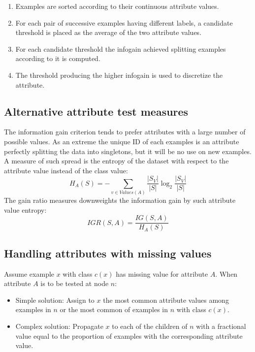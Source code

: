 	\begin{multicols}{2}
		\begin{enumerate}
			\item Examples are sorted according to their continuous attribute values.
			\item For each pair of successive examples having different labels, a candidate threshold is placed as the average of the two attribute values.
			\item For each candidate threshold the infogain achieved splitting examples according to it is computed.
			\item The threshold producing the higher infogain is used to discretize the attribute.
		\end{enumerate}
	\end{multicols}

	\subsection{Alternative attribute test measures}
	The information gain criterion tends to prefer attributes with a large number of possible values.
	As an extreme the unique ID of each examples is an attribute perfectly splitting the data into singletons, but it will be no use on new examples.
	A measure of such spread is the entropy of the dataset with respect to the attribute value instead of the class value:
	$$H_A(S) = -\sum\limits_{v\in Values(A)}\dfrac{|S_V|}{|S|}\log_2\dfrac{|S_V|}{|S|}$$
	The gain ratio measures downweights the information gain by such attribute value entropy:
	$$IGR(S,A) = \dfrac{IG(S,A)}{H_A(S)}$$

	\subsection{Handling attributes with missing values}
	Assume example $x$ with class $c(x)$ has missing value for attribute $A$.
	When attribute $A$ is to be tested at node $n$:

	\begin{multicols}{2}
		\begin{itemize}
			\item Simple solution: Assign to $x$ the most common attribute values among examples in $n$ or the most common of examples in $n$ with class $c(x)$.
			\item Complex solution: Propagate $x$ to each of the children of $n$ with a fractional value equal to the proportion of examples with the corresponding attribute value.
		\end{itemize}
	\end{multicols}

